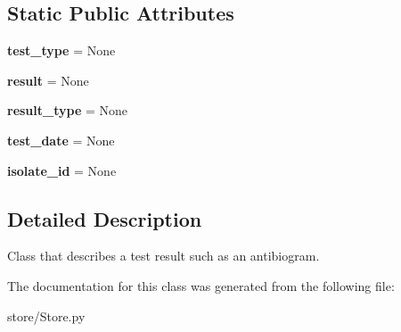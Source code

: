 \subsection*{Static Public Attributes}
\begin{DoxyCompactItemize}
\item 
\hypertarget{classstore_1_1_store_1_1_result_a1f79dd282c1a466c756a81fd5dc6a4c2}{{\bfseries test\-\_\-type} = None}\label{classstore_1_1_store_1_1_result_a1f79dd282c1a466c756a81fd5dc6a4c2}

\item 
\hypertarget{classstore_1_1_store_1_1_result_a95b08efeba19e328bfa909ac27ee44c9}{{\bfseries result} = None}\label{classstore_1_1_store_1_1_result_a95b08efeba19e328bfa909ac27ee44c9}

\item 
\hypertarget{classstore_1_1_store_1_1_result_a3f42ca76b24b92b2f23dee79ca7b4b8f}{{\bfseries result\-\_\-type} = None}\label{classstore_1_1_store_1_1_result_a3f42ca76b24b92b2f23dee79ca7b4b8f}

\item 
\hypertarget{classstore_1_1_store_1_1_result_a77ef210d749a37d02140fbac6ed88326}{{\bfseries test\-\_\-date} = None}\label{classstore_1_1_store_1_1_result_a77ef210d749a37d02140fbac6ed88326}

\item 
\hypertarget{classstore_1_1_store_1_1_result_aa55b328d0989fa4b16dd8e17af62ba7f}{{\bfseries isolate\-\_\-id} = None}\label{classstore_1_1_store_1_1_result_aa55b328d0989fa4b16dd8e17af62ba7f}

\end{DoxyCompactItemize}


\subsection{Detailed Description}
Class that describes a test result such as an antibiogram. 

The documentation for this class was generated from the following file\-:\begin{DoxyCompactItemize}
\item 
store/Store.\-py\end{DoxyCompactItemize}
